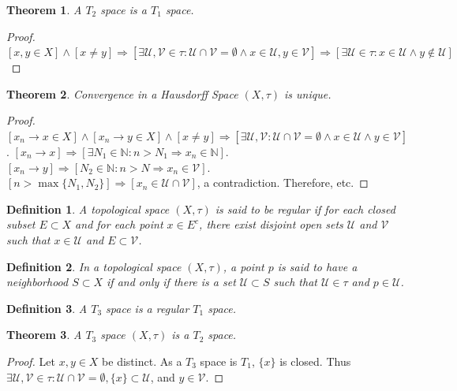 \documentclass[12pt,oneside]{book}
\theoremstyle{mystyle}
\newtheorem{theorem}{Theorem}[section]
\newtheorem{definition}{Definition}[section]
\begin{document}
\begin{theorem}
A $T_2$ space is a $T_1$ space.
\end{theorem}
\begin{proof}
$[x,y\in X]\land [x\ne y]\Rightarrow [\exists \mathcal{U},\mathcal{V}\in \tau:\mathcal{U}\cap \mathcal{V}=\emptyset\land x\in \mathcal{U},y\in \mathcal{V}]\Rightarrow [\exists \mathcal{U}\in \tau:x\in \mathcal{U}\land y\notin \mathcal{U}]$
\end{proof}

\begin{theorem}
Convergence in a Hausdorff Space $(X,\tau)$ is unique.
\end{theorem}
\begin{proof}
$[x_n \rightarrow x\in X]\land [x_n \rightarrow y\in X]\land[x\ne y]\Rightarrow [\exists \mathcal{U},\mathcal{V}:\mathcal{U}\cap \mathcal{V}=\emptyset\land x\in \mathcal{U}\land y\in \mathcal{V}]$. $[x_n\rightarrow x]\Rightarrow [\exists N_1\in \mathbb{N}:n>N_1\Rightarrow x_n \in \mathbb{N}]$. $[x_n\rightarrow y]\Rightarrow [N_2\in \mathbb{N}:n>N\Rightarrow x_n \in \mathcal{V}]$. $[n>\max\{N_1,N_2\}]\Rightarrow [x_n \in \mathcal{U}\cap \mathcal{V}]$, a contradiction. Therefore, etc.
\end{proof}

\begin{definition}
A topological space $(X,\tau)$ is said to be regular if for each closed subset $E\subset X$ and for each point $x\in E^c$, there exist disjoint open sets $\mathcal{U}$ and $\mathcal{V}$ such that $x\in \mathcal{U}$ and $E\subset \mathcal{V}$.
\end{definition} 

\begin{definition}
In a topological space $(X,\tau)$, a point $p$ is said to have a neighborhood $S\subset X$ if and only if there is a set $\mathcal{U}\subset S$ such that $\mathcal{U}\in \tau$ and $p\in \mathcal{U}$.
\end{definition}

\begin{definition}
A $T_3$ space is a regular $T_1$ space.
\end{definition}

\begin{theorem}
A $T_3$ space $(X,\tau)$ is a $T_2$ space.
\end{theorem}
\begin{proof}
Let $x,y\in X$ be distinct. As a $T_3$ space is $T_1$, $\{x\}$ is closed. Thus $\exists \mathcal{U},\mathcal{V}\in\tau: \mathcal{U}\cap\mathcal{V}=\emptyset, \{x\}\subset \mathcal{U}$, and $y\in \mathcal{V}$.
\end{proof}
\end{document}
